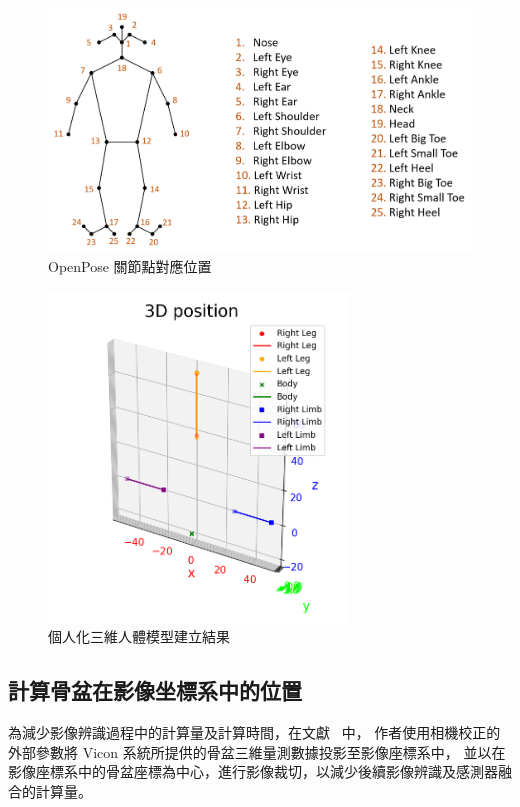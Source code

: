 \begin{figure}[!ht]
   \centering
   \includegraphics[width=\linewidth]{figure/ch3_fig_OpenPose.png}
    \caption[OpenPose 關節點對應位置]{OpenPose 關節點對應位置}
    \label{ch3_fig_OpenPose}
\end{figure}

\begin{figure}[!ht]
   \centering
   \includegraphics[width=8cm]{figure/ch3_fig_my_skeleton.png}
   \caption[個人化三維人體模型建立結果]{個人化三維人體模型建立結果}
   \label{ch3_fig_my_skeleton}
\end{figure}

\subsection{計算骨盆在影像坐標系中的位置}
為減少影像辨識過程中的計算量及計算時間，在文獻~\cite{Zhang_2020_CVPR} 中，
作者使用相機校正的外部參數將 Vicon 系統所提供的骨盆三維量測數據投影至影像座標系中，
並以在影像座標系中的骨盆座標為中心，進行影像裁切，以減少後續影像辨識及感測器融合的計算量。


